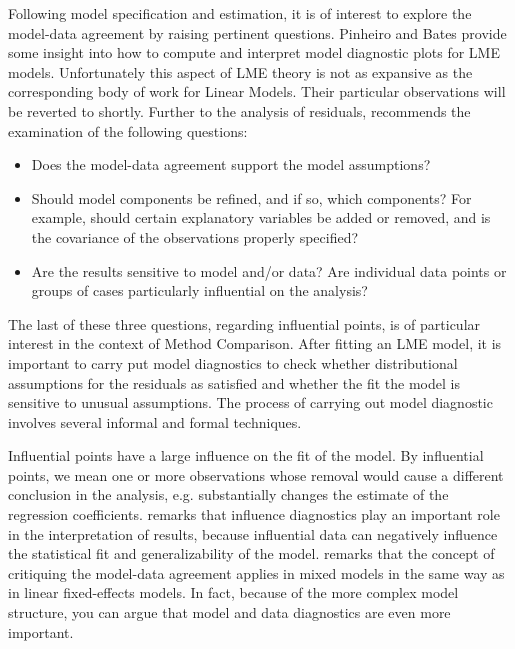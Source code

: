 \documentclass[12pt, a4paper]{report}
\theoremstyle{plain}
\theoremstyle{definition}
\theoremstyle{remark}
\begin{document}
	
	Following model specification and estimation, it is of interest to explore the model-data
	agreement by raising pertinent questions. Pinheiro and Bates provide some insight into how to compute and interpret model diagnostic plots for LME models. Unfortunately this aspect of LME theory is not as expansive as the corresponding body of work for Linear Models. Their particular observations will be reverted to shortly. Further to the analysis of residuals, \citet{schabenberger} recommends the examination of the following questions:
	\begin{itemize}
		\item Does the model-data agreement support the model assumptions?
		\item Should model components be refined, and if so, which components? For example, should certain explanatory variables
		be added or removed, and is the covariance of the observations properly specified?
		\item Are the results sensitive to model and/or data? Are individual data points or groups of cases particularly
		influential on the analysis?
	\end{itemize}
	
	The last of these three questions, regarding influential points, is of particular interest in the context of Method Comparison. After fitting an LME model, it is important to carry put model diagnostics to check whether distributional assumptions for the
	residuals as satisfied and whether the fit the model is sensitive to unusual assumptions. The process of carrying out model
	diagnostic involves several informal and formal techniques.
	
	Influential points have a large influence on the fit of the model. By influential points, we mean one or more observations whose removal would cause a different conclusion in the analysis, e.g. substantially changes the estimate of the regression coefficients. \citet{west} remarks that influence diagnostics play an important role in the interpretation of results, because influential data can negatively 
	influence the statistical fit and generalizability of the model.
	\citet{schabenberger} remarks that the concept of critiquing the model-data agreement applies in mixed models in the same way as in linear
	fixed-effects models. In fact, because of the more complex model structure, you can argue that model and
	data diagnostics are even more important.
	
	
\end{document}
